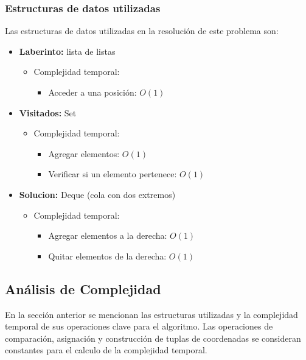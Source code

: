 \subsubsection{Estructuras de datos utilizadas}
Las estructuras de datos utilizadas en la resolución de este problema son:
\begin{itemize}
    \item \textbf{Laberinto:} lista de listas
    \begin{itemize}
        \item Complejidad temporal:
        \begin{itemize}
            \item Acceder a una posición: $O(1)$
        \end{itemize}
    \end{itemize}

    \item \textbf{Visitados:} Set
    \begin{itemize}
        \item Complejidad temporal:
        \begin{itemize}
            \item Agregar elementos: $O(1)$
            \item Verificar si un elemento pertenece: $O(1)$
        \end{itemize}
    \end{itemize}

    \item \textbf{Solucion:} Deque (cola con dos extremos)
    \begin{itemize}
        \item Complejidad temporal:
        \begin{itemize}
            \item Agregar elementos a la derecha: $O(1)$
            \item Quitar elementos de la derecha: $O(1)$
        \end{itemize}
    \end{itemize}
\end{itemize}

\subsection{Análisis de Complejidad}
En la sección anterior se mencionan las estructuras utilizadas y la complejidad temporal de sus operaciones clave para el algoritmo. 
Las operaciones de comparación, asignación y construcción de tuplas de coordenadas se consideran constantes para el calculo de la complejidad temporal.

